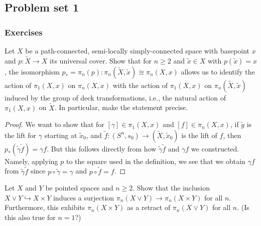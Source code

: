 
\subsection{Problem set 1}



\subsubsection{Exercises}


\begin{exercise}
    Let $X$ be a path-connected, semi-locally simply-connected
    space with basepoint $x$ and $p \colon \tilde{X}\to X$ its
    universal cover. Show that for $n\ge 2$ and
     $\tilde{x} \in X$ with $p (\tilde{x}) = x$, the isomorphism
     $p_* = \pi_n (p) \colon \pi_n \left( \tilde{X}, \tilde{x} \right) 
     \cong \pi_n(X, x)$ allows us to identify the
     action of $\pi_1 \left( X, x \right) $ on $\pi_n (X, x)$ with
     the action of $\pi_1 \left( X, x \right) $ on
     $\pi_n \left( \tilde{X}, \tilde{x} \right) $ induced by
     the group of deck transformations, i.e., the natural action
     of $\pi_1 (X, x)$ on $\tilde{X}$. In particular, make the
     statement precise.
\end{exercise}

\begin{proof}
    We want to show that for $\left[ \gamma \right] 
    \in \pi_1(X, x)$ and
    $\left[ f \right] \in \pi_n \left( X, x \right) $,
    if $\tilde{g}$ is the lift for $\gamma$ starting at
    $\tilde{x}_0$, and
    $\tilde{f} \colon \left( S^{n}, s_0 \right) 
    \to \left( \tilde{X}, \tilde{x}_0 \right) $ is the
    lift of $f$, then
    $p_* \left( \tilde{\gamma} \tilde{f} \right) 
    = \gamma f$. But this follows directly from how
    $\tilde{\gamma} \tilde{f}$ and 
    $\gamma f$ we constructed. Namely, applying
    $p$ to the square used in the definition, we see that we
    obtain $\gamma f$ from $\tilde{\gamma} \tilde{f}$ since
    $p \circ \tilde{\gamma} = \gamma$ and
    $p \circ \tilde{f} = f$.

\end{proof}


\begin{exercise}[]
    Let $X$ and $Y$ be pointed spaces and $n \ge 2$. Show that the
    inclusion $X \vee Y \hookrightarrow X \times Y$ induces
    a surjection $\pi_n \left( X \vee Y \right) 
    \to \pi_n \left( X \times Y \right) $ for all $n$. Furthermore,
    this exhibits $\pi_n \left( X \times Y \right) $ as
    a retract of $\pi_n \left( X \vee Y \right) $ for all $n$.
    (Is this also true for $n=1$?)
\end{exercise}

